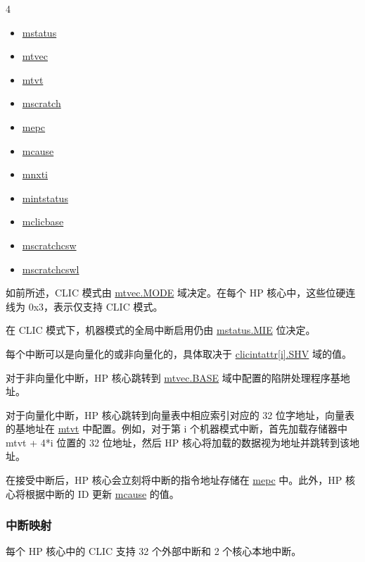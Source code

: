 \documentclass[main\_\_CN.tex]{subfiles}
\begin{document}
\begin{multicols}{4}
\begin{itemize}
\item \hyperref[regdesc:MSTATUS]{mstatus}
\item \hyperref[regdesc:MTVEC]{mtvec}
\item \hyperref[regdesc:MTVT]{mtvt}
\item \hyperref[regdesc:MSCRATCH]{mscratch}
\item \hyperref[regdesc:MEPC]{mepc}
\item \hyperref[regdesc:MCAUSE]{mcause}
\item \hyperref[regdesc:MNXTI_REG]{mnxti}
\item \hyperref[regdesc:MINTSTATUS]{mintstatus}
\item \hyperref[regdesc:MCLICBASE_REG]{mclicbase}
\item \hyperref[regdesc:MSCRATCHCSW_REG]{mscratchcsw}
\item \hyperref[regdesc:MSCRATCHCSWL_REG]{mscratchcswl}
\end{itemize}
\end{multicols}


如前所述，CLIC 模式由 \hyperref[fielddesc:MTVECMODE]{mtvec.MODE} 域决定。在每个 HP 核心中，这些位硬连线为 0x3，表示仅支持 CLIC 模式。

在 CLIC 模式下，机器模式的全局中断启用仍由 \hyperref[fielddesc:MSTATUSMIE]{mstatus.MIE} 位决定。


每个中断可以是向量化的或非向量化的，具体取决于 \hyperref[fielddesc:MCLICINTATTR_i_SHV]{clicintattr[i].SHV} 域的值。

对于非向量化中断，HP 核心跳转到 \hyperref[fielddesc:MTVECBASE]{mtvec.BASE} 域中配置的陷阱处理程序基地址。

对于向量化中断，HP 核心跳转到向量表中相应索引对应的 32 位字地址，向量表的基地址在 \hyperref[regdesc:MTVT]{mtvt} 中配置。例如，对于第 i 个机器模式中断，首先加载存储器中 mtvt + 4*i 位置的 32 位地址，然后 HP 核心将加载的数据视为地址并跳转到该地址。

在接受中断后，HP 核心会立刻将中断的指令地址存储在 \hyperref[regdesc:MEPC]{mepc} 中。此外，HP 核心将根据中断的 ID 更新 \hyperref[regdesc:MCAUSE]{mcause} 的值。


\hypertarget{riscvcpu-clic-intmap}{}
\subsubsection{中断映射}
\label{sec:riscvcpu-clic-intmap}

每个 HP 核心中的 CLIC 支持 32 个外部中断和 2 个核心本地中断。
\end{document}
